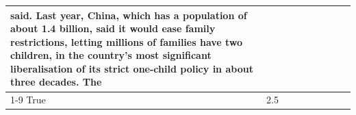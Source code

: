 \begin{table}[H]
\begin{tabular}{lllrlllll}
said. Last year, China, which has a population of about 1.4 billion, said it would ease family restrictions, letting millions of families have two children, in the country's most significant liberalisation of its strict one-child policy in about three decades. The \\
\cline{1-9}
True & 2.5%
\end{tabular}
\end{table}
